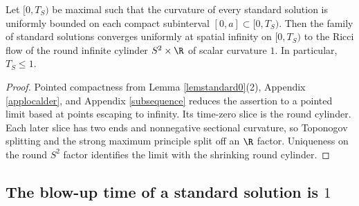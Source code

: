 \begin{lemma}
  \label{lem:kl-blow-up-time-standard-solution-compactness-standard-solutions}
 \label{lemclaim2}
Let $[0,T_S)$ be maximal such that the curvature of every standard solution is
uniformly bounded on each compact subinterval $[0,a]\subset[0,T_S)$. Then the
family of standard solutions converges uniformly at spatial infinity on
$[0,T_S)$ to the Ricci flow of the round infinite cylinder $S^2\times\R$ of
scalar curvature $1$. In particular, $T_S\leq1$.
\end{lemma}
\begin{proof}
\sketch Pointed compactness from Lemma \ref{lemstandard0}(2), Appendix
\ref{applocalder}, and Appendix \ref{subsequence} reduces the assertion to a
pointed limit based at points escaping to infinity. Its time-zero slice is the
round cylinder. Each later slice has two ends and nonnegative sectional
curvature, so Toponogov splitting and the strong maximum principle split off an
$\R$ factor. Uniqueness on the round $S^2$ factor identifies the limit with the
shrinking round cylinder.
\end{proof}

\subsection{The blow-up time of a standard solution is $1$}
\label{secclaim4}

